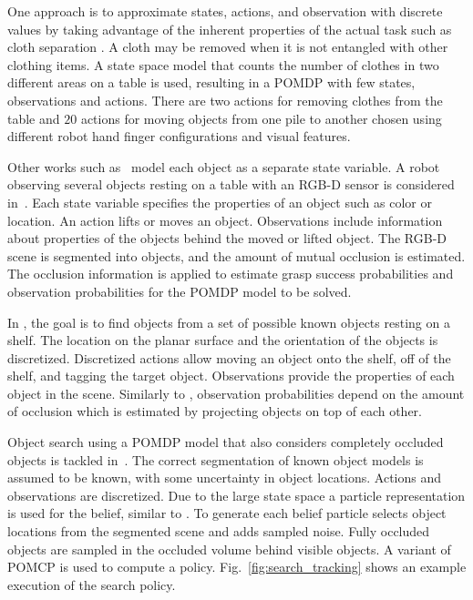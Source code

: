 \documentclass[journal]{IEEEtran}
\begin{document}
One approach is to approximate states, actions, and observation with
discrete values by taking advantage of the inherent properties of the
actual task such as cloth separation \cite{monso2012pomdp}. A cloth may be removed when it is not entangled with other clothing items. A state space model that counts the
number of clothes in two different areas on a table is used, resulting in a
POMDP with few states, observations and actions. There are two actions for removing clothes from the table and $20$
actions for moving objects from one pile to another chosen using
different robot hand finger configurations and visual features.

Other works such as~\cite{pajarinen2017robotic,pajarinen2014robotic,li2016act,xiao2019online,pajarinen2020pomdp}
model each object as a separate state
variable. A robot
observing several objects resting on a table with an RGB-D sensor is considered in~\cite{pajarinen2017robotic}. Each state variable specifies the
properties of an object such as color or location. An action lifts or
moves an object. Observations include information about properties of
the objects behind the moved or lifted object. The
RGB-D scene is segmented into objects, and the amount of mutual occlusion is estimated.
The occlusion information is applied to estimate grasp success
probabilities and observation probabilities for the POMDP model to be solved.

In \cite{li2016act}, the goal is to find objects from a set of
possible known objects resting on a shelf. The
location on the planar surface and the orientation of the objects is
discretized. Discretized actions allow moving an object {onto} the
shelf, {off} of the shelf, and tagging the target object. Observations
provide the properties of each object in the scene. Similarly to
\cite{pajarinen2017robotic}, observation probabilities depend on the
amount of occlusion which is estimated by
projecting objects on top of each other.

Object search using a POMDP model that also considers completely occluded objects is tackled in~\cite{xiao2019online}.
The correct segmentation of known object models is assumed to be known, with some uncertainty in
object locations. Actions and observations are discretized. Due to the
large state space a particle representation is used for the belief, similar to
\cite{pajarinen2017robotic,li2016act}. To
generate each belief particle \cite{xiao2019online} selects object
locations from the segmented scene and adds sampled noise. Fully
occluded objects are sampled in the occluded volume behind visible objects. A variant of
POMCP is used to compute a policy.
Fig.~\ref{fig:search_tracking} shows an example execution of the search policy.
\end{document}
